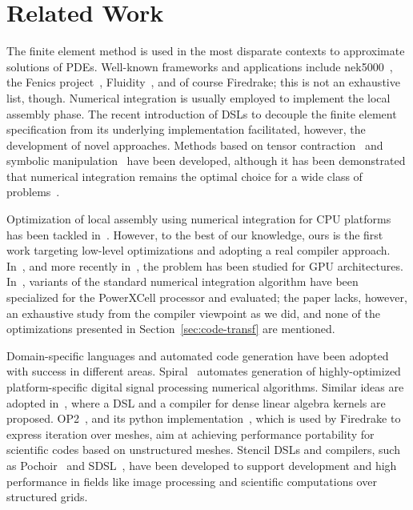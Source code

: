 \documentclass[conference]{IEEEtran}
\begin{document}
\section{Related Work}
\label{sec:related-work}
The finite element method is used in the most disparate contexts to approximate solutions of PDEs. Well-known frameworks and applications include nek5000~\cite{nek5000-web-page}, the Fenics project~\cite{Fenics}, Fluidity~\cite{fluidity_manual_v4}, and of course Firedrake; this is not an exhaustive list, though. Numerical integration is usually employed to implement the local assembly phase. The recent introduction of DSLs to decouple the finite element specification from its underlying implementation facilitated, however, the development of novel approaches. Methods based on tensor contraction~\cite{FFC-TC} and symbolic manipulation~\cite{Francis} have been developed, although it has been demonstrated that numerical integration remains the optimal choice for a wide class of problems~\cite{quadrature1}.

Optimization of local assembly using numerical integration for CPU platforms has been tackled in~\cite{quadrature1}. However, to the best of our knowledge, ours is the first work targeting low-level optimizations and adopting a real compiler approach. In~\cite{Markall20101815}, and more recently in~\cite{petsc-integration-gpu}, the problem has been studied for GPU architectures. In~\cite{assembly-opencl}, variants of the standard numerical integration algorithm have been specialized for the PowerXCell processor and evaluated; the paper lacks, however, an exhaustive study from the compiler viewpoint as we did, and none of the optimizations presented in Section~\ref{sec:code-transf} are mentioned.

Domain-specific languages and automated code generation have been adopted with success in different areas. Spiral~\cite{Pueschel:05} automates generation of highly-optimized platform-specific digital signal processing numerical algorithms. Similar ideas are adopted in~\cite{Spampinato:14}, where a DSL and a compiler for dense linear algebra kernels are proposed. OP2~\cite{op2-main}, and its python implementation~\cite{pyop2isc}, which is used by Firedrake to express iteration over meshes, aim at achieving performance portability for scientific codes based on unstructured meshes. Stencil DSLs and compilers, such as Pochoir~\cite{pochoir} and SDSL~\cite{stencil-compiler}, have been developed to support development and high performance in fields like image processing and scientific computations over structured grids.
\end{document}
